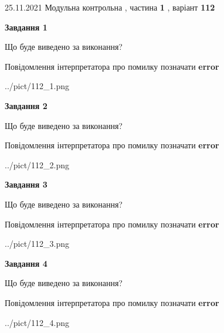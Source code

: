 \documentclass[10pt, ukrainian]{article}
\begin{document}
{25.11.2021 Модульна контрольна , частина \textbf { 1 }, варіант  \No \textbf { 112 }\par}
{
\begin {large}

{\begin {center}\textbf{Завдання 1}\end {center}}\par
Що буде виведено за виконання? \par
Повідомлення інтерпретатора про помилку позначати \textbf{error}

\begin{center}
	{../pict/112_1.png}
\end{center}
\newpage

{\begin {center}\textbf{Завдання 2}\end {center}}\par
Що буде виведено за виконання? \par
Повідомлення інтерпретатора про помилку позначати \textbf{error}

\begin{center}
	{../pict/112_2.png}
\end{center}
\newpage

{\begin {center}\textbf{Завдання 3}\end {center}}\par
Що буде виведено за виконання? \par
Повідомлення інтерпретатора про помилку позначати \textbf{error}

\begin{center}
	{../pict/112_3.png}
\end{center}
\newpage

{\begin {center}\textbf{Завдання 4}\end {center}}\par
Що буде виведено за виконання? \par
Повідомлення інтерпретатора про помилку позначати \textbf{error}

\begin{center}
	{../pict/112_4.png}
\end{center}
\newpage


\end{large}}
\end{document}
